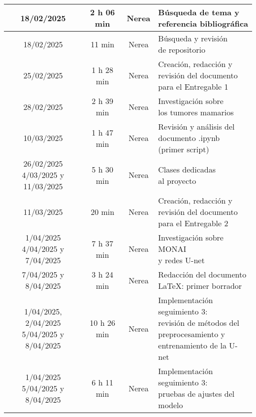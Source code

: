 \documentclass[12pt]{article}
\begin{document}
\begin{longtable}{|c|c|c|p{7.5cm}|}
18/02/2025 & 2 h 06 min & Nerea & \makecell{Búsqueda de tema y \\ referencia bibliográfica} \\
\hline
18/02/2025 & 11 min & Nerea & \makecell{Búsqueda y revisión \\ de repositorio} \\
\hline
25/02/2025 & 1 h 28 min & Nerea & \makecell{Creación, redacción y \\ revisión del documento \\ para el Entregable 1} \\
\hline
28/02/2025 & 2 h 39 min & Nerea & \makecell{Investigación sobre \\ los tumores mamarios} \\
\hline
10/03/2025 & 1 h 47 min & Nerea & \makecell{Revisión y análisis del \\ documento .ipynb \\ (primer script)} \\
\hline
\makecell{26/02/2025 \\ 4/03/2025 y 11/03/2025} & 5 h 30 min & Nerea & \makecell{Clases dedicadas \\ al proyecto} \\
\hline
11/03/2025 & 20 min & Nerea & \makecell{Creación, redacción y \\ revisión del documento \\ para el Entregable 2} \\
\hline
\makecell{1/04/2025 \\ 4/04/2025 y 7/04/2025} & 7 h 37 min & Nerea & \makecell{Investigación sobre MONAI \\ y redes U-net} \\
\hline
7/04/2025 y 8/04/2025 & 3 h 24 min & Nerea & \makecell{Redacción del documento \\ LaTeX: primer borrador} \\
\hline
\makecell{1/04/2025, \\ 2/04/2025 \\ 5/04/2025 y \\ 8/04/2025} & 10 h 26 min & Nerea & \makecell{Implementación seguimiento 3: \\ revisión de métodos del \\ preprocesamiento y \\ entrenamiento de la U-net} \\
\hline
\makecell{1/04/2025 \\ 5/04/2025 y 8/04/2025} & 6 h 11 min & Nerea & \makecell{Implementación seguimiento 3: \\ pruebas de ajustes del modelo} \\

\end{longtable}
\end{document}
